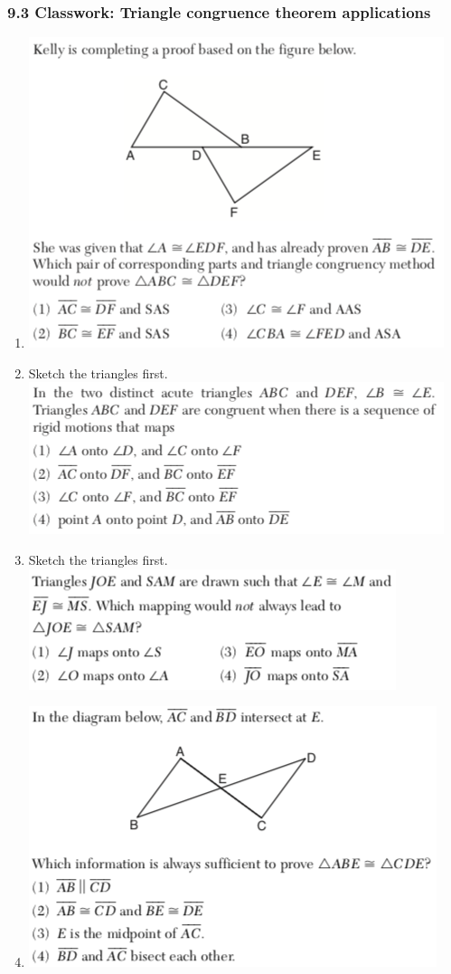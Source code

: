 \documentclass[12pt, twoside]{article}
\begin{document}
\subsubsection*{9.3 Classwork: Triangle congruence theorem applications}
  \begin{enumerate}

    \item \includegraphics[scale=0.8]{geom-62017-9.png}
    \item Sketch the triangles first. \\
    \includegraphics[scale=0.8]{geom-62017-22.png}
    \item Sketch the triangles first. \\
      \includegraphics[scale=0.8]{geom-62019-14.png}
    \item \includegraphics[scale=0.8]{geom-62019-8.png}

\end{enumerate}
\end{document}
